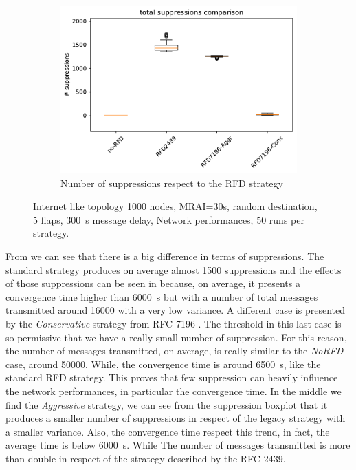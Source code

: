 \begin{figure}[h]
\begin{subfigure}[b]{0.325\textwidth}
     \end{subfigure}
     \hfill
     \begin{subfigure}[b]{0.325\textwidth}
         \centering
         \includegraphics[width=\textwidth]{images/RFD/miceVSelephants/mice/cisco_1000MRAI30_rfd_comparison_suppressions_boxplot.pdf}
         \caption{Number of suppressions respect to the RFD strategy}
         \label{fig:1000_RFD_MRAI30_mice_suppressions_bis}
     \end{subfigure}
		\caption{Internet like topology 1000 nodes, MRAI=30s, random destination,
		5 flaps, \SI{300}{\second} message delay, Network performances,
		\num{50} runs per strategy.}
        \label{fig:1000_RFD_MRAI30_mice_bis}
\end{figure}

From  we can see that there is a
big difference in terms of suppressions.
The standard strategy produces on average almost \num{1500} suppressions and the effects
of those suppressions can be seen in 
because, on average, it presents a convergence time higher than \SI{6000}{\second}
but with a number of total messages transmitted around \num{16000} with a very
low variance.
A different case is presented by the \textit{Conservative} strategy from \ac{RFC}
7196 \cite{rfc7196}.
The threshold in this last case is so permissive that we have a really small
number of suppression.
For this reason, the number of messages transmitted, on average, is really similar to
the \textit{NoRFD} case, around \num{50000}.
While, the convergence time is around \SI{6500}{\second}, like the standard \ac{RFD}
strategy.
This proves that few suppression can heavily influence the network performances,
in particular the convergence time.
In the middle we find the \textit{Aggressive} strategy, we can see from the
suppression boxplot that it produces a smaller number of suppressions in respect
of the legacy strategy with a smaller variance.
Also, the convergence time respect this trend, in fact, the average time is
below \SI{6000}{\second}.
While The number of messages transmitted is more than double in respect
of the strategy described by the \ac{RFC} \num{2439}.

